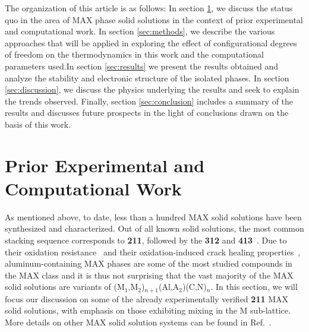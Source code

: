 \documentclass[preprint,amsmath,amssymb,aps, prb,showkeys]{revtex4-1}
\begin{document}
The organization of this article is as follows: In section \ref{sec:prior}, we discuss the status quo in the area of MAX phase solid solutions in the context of prior experimental and computational work. In section \ref{sec:methods}, we describe the various approaches that will be applied in exploring the effect of configurational degrees of freedom on the thermodynamics in this work and the computational parameters used.In section \ref{sec:results} we present the results obtained and analyze the stability and electronic structure of the isolated phases. In section \ref{sec:discussion}, we discuss the physics underlying the results and seek to explain the trends observed. Finally, section \ref{sec:conclusion} includes a summary of the results and discusses future prospects in the light of conclusions drawn on the basis of this work.
\section{Prior Experimental and Computational Work}
\label{sec:prior}

As mentioned above, to date, less than a hundred MAX solid solutions have been synthesized and characterized. Out of all known solid solutions, the most common stacking sequence corresponds to \textbf{211}, followed by the \textbf{312} and \textbf{413}~\cite{naguib2014new}. Due to their oxidation resistance~\cite{sundberg2004alumina, tallman2013critical, basu2011long} and their oxidation-induced crack healing properties~\cite{song2008oxidation,li2012multiple, sloof2016repeated}, aluminum-containing MAX phases are some of the most studied compounds in the MAX class and it is thus not surprising that the vast majority of the  MAX solid solutions are variants of (M$_1$,M$_2$)$_{n+1}$(Al,A$_2$)(C,N)$_n$. In this section, we will focus our discussion on some of the already experimentally verified \textbf{211} MAX solid solutions, with emphasis on those exhibiting mixing in the M sub-lattice. More details on other MAX solid solution systems can be found in Ref.~\cite{naguib2014new}.
\end{document}
